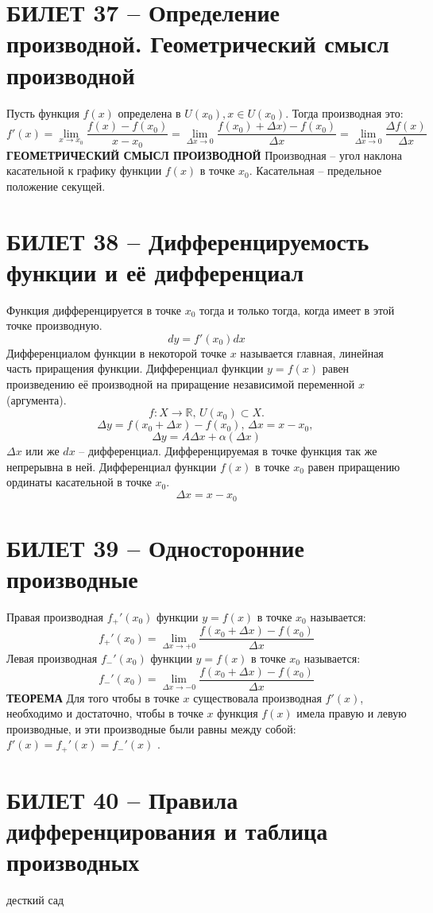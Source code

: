 \documentclass{article}
\newcommand{\R}{\mathbb R}
\begin{document}
\section{БИЛЕТ 37 -- Определение производной. Геометрический смысл производной}
Пусть функция $f(x)$ определена в $U(x_0), x\in U(x_0)$. Тогда производная это:
$$ f'(x)=\lim_{x\to x_0} \frac{f(x)-f(x_0)}{x-x_0} = \lim_{\Delta x \to 0} \frac{f(x_0)+\Delta x)-f(x_0)}{\Delta x}=\lim_{\Delta x \to 0} \frac{\Delta f(x)}{\Delta x}$$
\textbf{ГЕОМЕТРИЧЕСКИЙ СМЫСЛ ПРОИЗВОДНОЙ} Производная -- угол наклона касательной к графику функции $f(x)$ в точке $x_0$. Касательная -- предельное положение секущей.
\newpage
\section{БИЛЕТ 38 -- Дифференцируемость функции и её дифференциал}
Функция дифференцируется в точке $x_0$ тогда и только тогда, когда имеет в этой точке производную.
$$ dy=f'(x_0)dx $$
Дифференциалом функции в некоторой точке $x$ называется главная, линейная часть приращения функции. Дифференциал функции $y = f(x)$ равен произведению её производной на приращение независимой переменной $x$ (аргумента).
$$ f:X\to\R,\,U(x_0)\subset X.$$
$$ \Delta y=f(x_0+\Delta x)-f(x_0),\,\Delta x=x-x_0,\, $$
$$ \Delta y=A\Delta x+\alpha(\Delta x) $$
$\Delta x$ или же $dx$ -- дифференциал.
\newline
Дифференцируемая в точке функция так же непрерывна в ней.
\newline
Дифференциал функции $f(x)$ в точке $x_0$ равен приращению ординаты касательной в точке $x_0$.
$$ \Delta x=x-x_0$$
\newpage
\section{БИЛЕТ 39 -- Односторонние производные}
Правая производная $f_{+}'(x_0)$ функции $y=f(x)$ в точке $x_0$ называется:
$$ f_{+}'(x_0)=\lim_{\Delta x\to +0}\frac{f(x_0+\Delta x)-f(x_0)}{\Delta x} $$
Левая производная $f_{-}'(x_0)$ функции $y=f(x)$ в точке $x_0$ называется:
$$ f_{-}'(x_0)=\lim_{\Delta x\to -0}\frac{f(x_0+\Delta x)-f(x_0)}{\Delta x} $$
\textbf{ТЕОРЕМА} Для того чтобы в точке $x$ существовала производная $f'(x)$, необходимо и достаточно, чтобы в точке $x$ функция $f(x)$  имела правую и левую производные, и эти производные были равны между собой: $f'(x)=f_{+}'(x)=f_{-}'(x)$  .
\newpage
\section{БИЛЕТ 40 -- Правила дифференцирования и таблица производных}
десткий сад
\newpage
\end{document}
